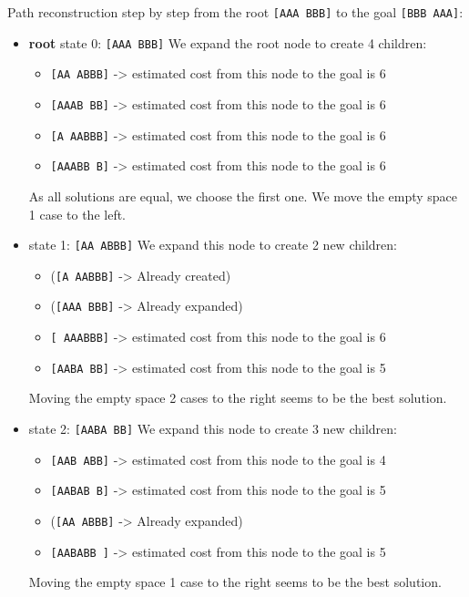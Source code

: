 \documentclass{article}
\begin{document}
Path reconstruction step by step from the root \texttt{[AAA BBB]} to the goal
\texttt{[BBB AAA]}:

\begin{itemize}
  \item \textbf{root} state 0: \texttt{[AAA BBB]}
  We expand the root node to create 4 children:
  \begin{itemize}
    \item \texttt{[AA ABBB]} -> estimated cost from this node to the goal is 6
    \item \texttt{[AAAB BB]} -> estimated cost from this node to the goal is 6
    \item \texttt{[A AABBB]} -> estimated cost from this node to the goal is 6
    \item \texttt{[AAABB B]} -> estimated cost from this node to the goal is 6
  \end{itemize}
  As all solutions are equal, we choose the first one.
  We move the empty space 1 case to the left.

  \item state  1: \texttt{[AA ABBB]}
  We expand this node to create 2 new children:
  \begin{itemize}
    \item (\texttt{[A AABBB]} -> Already created)
    \item (\texttt{[AAA BBB]} -> Already expanded)
    \item \texttt{[ AAABBB]} -> estimated cost from this node to the goal is 6
    \item \texttt{[AABA BB]} -> estimated cost from this node to the goal is 5
  \end{itemize}
  Moving the empty space 2 cases to the right seems to be the best solution. 

  \item state  2: \texttt{[AABA BB]}
  We expand this node to create 3 new children:
  \begin{itemize}
    \item \texttt{[AAB ABB]} -> estimated cost from this node to the goal is 4
    \item \texttt{[AABAB B]} -> estimated cost from this node to the goal is 5
    \item (\texttt{[AA ABBB]} -> Already expanded)
    \item \texttt{[AABABB ]} -> estimated cost from this node to the goal is 5
    \end{itemize}
  Moving the empty space 1 case to the right seems to be the best solution. 
  

\end{itemize}
\end{document}
